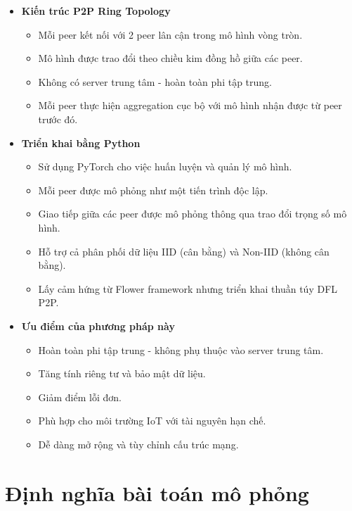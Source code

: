 \begin{itemize}
    \item \textbf{Kiến trúc P2P Ring Topology}
    \begin{itemize}
    \item Mỗi peer kết nối với 2 peer lân cận trong mô hình vòng tròn.
    \item Mô hình được trao đổi theo chiều kim đồng hồ giữa các peer.
    \item Không có server trung tâm - hoàn toàn phi tập trung.
    \item Mỗi peer thực hiện aggregation cục bộ với mô hình nhận được từ peer trước đó.
    \end{itemize}

    \item \textbf{Triển khai bằng Python}
    \begin{itemize}
    \item Sử dụng PyTorch cho việc huấn luyện và quản lý mô hình.
    \item Mỗi peer được mô phỏng như một tiến trình độc lập.
    \item Giao tiếp giữa các peer được mô phỏng thông qua trao đổi trọng số mô hình.
    \item Hỗ trợ cả phân phối dữ liệu IID (cân bằng) và Non-IID (không cân bằng).
    \item Lấy cảm hứng từ Flower framework \cite{beutel2020} nhưng triển khai thuần túy DFL P2P.
    \end{itemize}

    \item \textbf{Ưu điểm của phương pháp này}
    \begin{itemize}
    \item Hoàn toàn phi tập trung - không phụ thuộc vào server trung tâm.
    \item Tăng tính riêng tư và bảo mật dữ liệu.
    \item Giảm điểm lỗi đơn.
    \item Phù hợp cho môi trường IoT với tài nguyên hạn chế.
    \item Dễ dàng mở rộng và tùy chỉnh cấu trúc mạng.
    \end{itemize}
\end{itemize}

\section{Định nghĩa bài toán mô phỏng}

